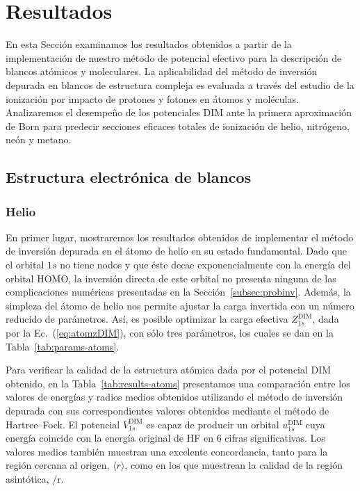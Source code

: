 \section{Resultados}
\label{sec:dimresultados}

En esta Sección examinamos los resultados obtenidos a partir de la 
implementación de nuestro método de potencial efectivo para la 
descripción de blancos atómicos y moleculares. La aplicabilidad del 
método de inversión depurada en blancos de estructura compleja es 
evaluada a través del estudio de la ionización por impacto de protones y 
fotones en átomos y moléculas. Analizaremos el desempeño de los  
potenciales DIM ante la primera aproximación de Born para predecir 
secciones eficaces totales de ionización de helio, nitrógeno, neón y 
metano.

\subsection{Estructura electrónica de blancos}
\label{subsec:dimtarget}

\subsubsection*{Helio}

En primer lugar, mostraremos los resultados obtenidos de implementar
el método de inversión depurada en el átomo de helio en su estado
fundamental. Dado que el orbital $1s$ no tiene nodos y que éste 
decae exponencialmente con la energía del orbital HOMO, la inversión 
directa de este orbital no presenta ninguna de las complicaciones 
numéricas presentadas en la Sección~\ref{subsec:probinv}. Además, la 
simpleza del átomo de helio nos permite ajustar la carga invertida con 
un número reducido de parámetros. Así, es posible optimizar la carga 
efectiva $Z_{1s}^{\mathrm{ DIM}}$, dada por la Ec.~(\ref{eq:atomzDIM}), 
con sólo tres parámetros, los cuales se dan en la 
Tabla~\ref{tab:params-atoms}.

Para verificar la calidad de la estructura atómica dada por el potencial 
DIM obtenido, en la Tabla~\ref{tab:results-atoms} presentamos una 
comparación entre los valores de energías y radios medios obtenidos 
utilizando el método de inversión depurada con sus correspondientes 
valores obtenidos mediante el método de Hartree--Fock. El potencial 
$V_{1s}^{\mathrm{ DIM}}$ es capaz de producir un orbital 
$u_{1s}^{\mathrm{ DIM}}$ cuya energía coincide con la energía original 
de HF en 6 cifras significativas. Los valores medios también muestran 
una excelente concordancia, tanto para la región cercana al origen, 
$\langle r \rangle$, como en los que muestrean la calidad de la región 
asintótica, /r\rangle.

